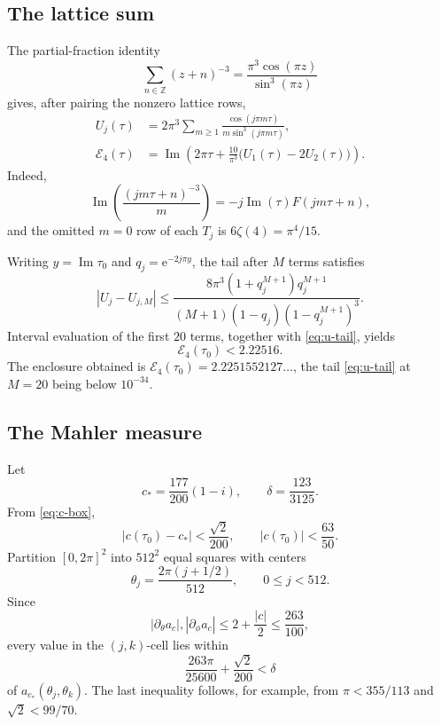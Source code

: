 \documentclass[11pt]{amsart}
\newcommand{\Z}{\mathbb Z}
\newcommand{\e}{\mathrm e}
\newcommand{\EK}{\mathcal E_4}
\renewcommand{\Im}{\operatorname{Im}}
\begin{document}
\subsection*{The lattice sum}

The partial-fraction identity
\[
 \sum_{n\in\Z}(z+n)^{-3}
 =\frac{\pi^3\cos(\pi z)}{\sin^3(\pi z)}
\]
gives, after pairing the nonzero lattice rows,
\begin{align*}
 U_j(\tau)&=2\pi^3\sum_{m\ge1}
 \frac{\cos(j\pi m\tau)}{m\sin^3(j\pi m\tau)},\\
 \EK(\tau)&=\Im\left(2\pi\tau+
 \frac{10}{\pi^3}\bigl(U_1(\tau)-2U_2(\tau)\bigr)\right).
\end{align*}
Indeed,
\[
 \Im\left(\frac{(jm\tau+n)^{-3}}m\right)
 =-j\Im(\tau)F(jm\tau+n),
\]
and the omitted $m=0$ row of each $T_j$ is
$6\zeta(4)=\pi^4/15$.

Writing $y=\Im\tau_0$ and $q_j=\e^{-2j\pi y}$, the tail after $M$
terms satisfies
\begin{equation}\label{eq:u-tail}
 |U_j-U_{j,M}|
 \le
 \frac{8\pi^3(1+q_j^{M+1})q_j^{M+1}}
 {(M+1)(1-q_j)(1-q_j^{M+1})^3}.
\end{equation}
Interval evaluation of the first $20$ terms, together with
\eqref{eq:u-tail}, yields
\begin{equation}\label{eq:ek-bound}
 \EK(\tau_0)<2.22516.
\end{equation}
The enclosure obtained is $\EK(\tau_0)=2.2251552127\ldots$, the tail
\eqref{eq:u-tail} at $M=20$ being below $10^{-34}$.

\subsection*{The Mahler measure}

Let
\[
 c_*=\frac{177}{200}(1-i),
 \qquad
 \delta=\frac{123}{3125}.
\]
From \eqref{eq:c-box},
\[
 |c(\tau_0)-c_*|<\frac{\sqrt2}{200},
 \qquad
 |c(\tau_0)|<\frac{63}{50}.
\]
Partition $[0,2\pi]^2$ into $512^2$ equal squares with centers
\[
 \theta_j=\frac{2\pi(j+1/2)}{512},
 \qquad 0\le j<512.
\]
Since
\[
 |\partial_\theta a_c|,|\partial_\phi a_c|
 \le 2+\frac{|c|}{2}\le\frac{263}{100},
\]
every value in the $(j,k)$-cell lies within
\[
 \frac{263\pi}{25600}+\frac{\sqrt2}{200}<\delta
\]
of $a_{c_*}(\theta_j,\theta_k)$. The last inequality follows, for
example, from $\pi<355/113$ and $\sqrt2<99/70$.
\end{document}

